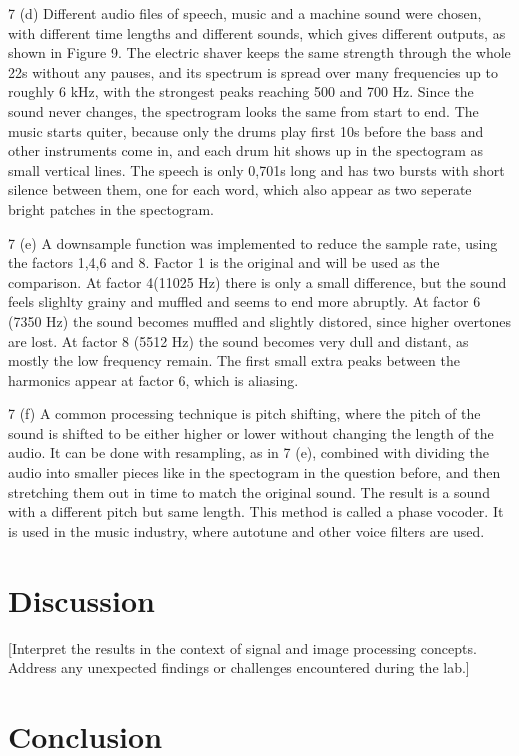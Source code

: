 \documentclass[11pt,a4paper]{article}
\begin{document}
7 (d) Different audio files of speech, music and a machine sound were chosen, with different time lengths and different sounds, which gives different outputs, as shown in Figure 9. The electric shaver keeps the same strength through the whole 22s without any pauses, and its spectrum is spread over many frequencies up to roughly 6 kHz, with the strongest peaks reaching 500 and 700 Hz. Since the sound never changes, the spectrogram looks the same from start to end. The music starts quiter, because only the drums play first 10s before the bass and other instruments come in, and each drum hit shows up in the spectogram as small vertical lines. The speech is only 0,701s long and has two bursts with short silence between them, one for each word, which also appear as two seperate bright patches in the spectogram.

7 (e) A downsample function was implemented to reduce the sample rate, using the factors 1,4,6 and 8. Factor 1 is the original and will be used as the comparison. At factor 4(11025 Hz) there is only a small difference, but the sound feels slighlty grainy and muffled and seems to end more abruptly. At factor 6 (7350 Hz) the sound becomes muffled and slightly distored, since higher overtones are lost. At factor 8 (5512 Hz) the sound becomes very dull and distant, as mostly the low frequency remain. The first small extra peaks between the harmonics appear at factor 6, which is aliasing.

7 (f) A common processing technique is pitch shifting, where the pitch of the sound is shifted to be either higher or lower without changing the length of the audio. It can be done with resampling, as in 7 (e), combined with dividing the audio into smaller pieces like in the spectogram in the question before, and then stretching them out in time to match the original sound. The result is a sound with a different pitch but same length. This method is called a phase vocoder. It is used in the music industry, where autotune and other voice filters are used.
\section{Discussion}

[Interpret the results in the context of signal and image processing
concepts. Address any unexpected findings or challenges encountered
during the lab.]

\section{Conclusion}
\end{document}
